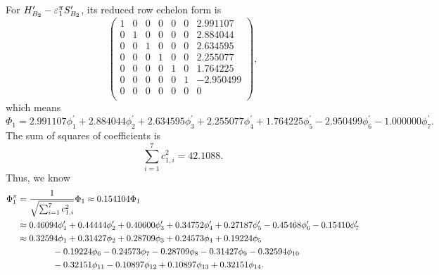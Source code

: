 		For $H^\prime_{B_2}-\varepsilon^\pi_1 S^\prime_{B_2}$, its reduced row echelon form is
		\begin{equation*}
			\begin{pmatrix}
			1 & 0 & 0 & 0 & 0 & 0 & 2.991107 \\
			0 & 1 & 0 & 0 & 0 & 0 & 2.884044 \\
			0 & 0 & 1 & 0 & 0 & 0 & 2.634595 \\
			0 & 0 & 0 & 1 & 0 & 0 & 2.255077 \\
			0 & 0 & 0 & 0 & 1 & 0 & 1.764225 \\
			0 & 0 & 0 & 0 & 0 & 1 & -2.950499 \\
			0 & 0 & 0 & 0 & 0 & 0 & 0 \\
			\end{pmatrix},
		\end{equation*}
		which means
		\begin{equation*}
			\Phi_1 = 2.991107 \phi^\prime_1 + 2.884044 \phi^\prime_2 + 2.634595 \phi^\prime_3 + 2.255077 \phi^\prime_4 + 1.764225 \phi^\prime_5 - 2.950499 \phi^\prime_6 - 1.000000 \phi^\prime_7.
		\end{equation*}
		The sum of squares of coefficients is
		\begin{equation*}
			\sum_{i=1}^7 c^2_{1,i} = 42.1088.
		\end{equation*}
		Thus, we know
		\begin{align}
			\Phi^\pi_1 &= \frac{1}{\sqrt{\sum_{i=1}^7 c^2_{1,i}}} \Phi_1 \approx 0.154104 \Phi_1 \notag \\
			&\approx 0.46094 \phi^\prime_1 + 0.44444 \phi^\prime_2 + 0.40600 \phi^\prime_3 + 0.34752 \phi^\prime_4 + 0.27187 \phi^\prime_5 - 0.45468 \phi^\prime_6 - 0.15410 \phi^\prime_7 \notag \\
			&\approx 0.32594 \phi_1 + 0.31427 \phi_2 + 0.28709 \phi_3 + 0.24573 \phi_4 + 0.19224 \phi_5  \notag \\
			&\hspace*{4em} - 0.19224\phi_6 - 0.24573 \phi_7 - 0.28709 \phi_8 - 0.31427 \phi_9  -0.32594\phi_{10} \notag \\
			&\hspace*{4em}- 0.32151 \phi_{11} - 0.10897 \phi_{12} + 0.10897 \phi_{13} + 0.32151 \phi_{14} .
		\end{align}	
		
